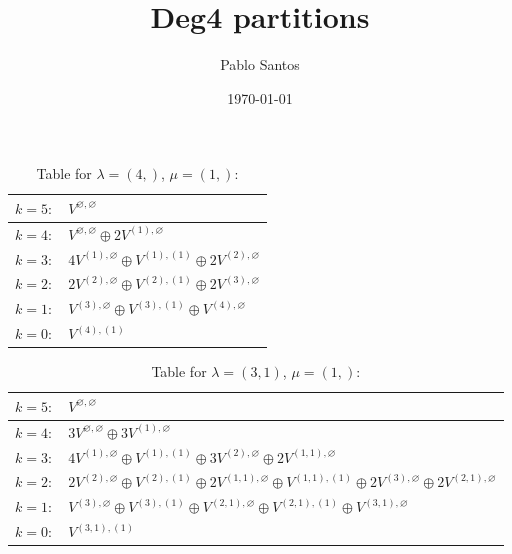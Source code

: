 \documentclass[a4paper,12pt]{article}
\title{Deg4 partitions}
\author{Pablo Santos}
\date{\today}
\begin{document}
\renewcommand{\arraystretch}{1.6} 
\begin{table}[H]
\centering
\caption{Table for $\lambda = (4,)$, $\mu = (1,)$:}
\begin{tabular}{|>{\centering\arraybackslash}p{15cm}|}
\hline
 $k = 5: \quad V^{\varnothing, \varnothing} $ \\ \hline
 $k = 4: \quad V^{\varnothing, \varnothing} \oplus 2 V^{(1), \varnothing} $ \\ \hline
 $k = 3: \quad 4 V^{(1), \varnothing} \oplus V^{(1), (1)} \oplus 2 V^{(2), \varnothing} $ \\ \hline
 $k = 2: \quad 2 V^{(2), \varnothing} \oplus V^{(2), (1)} \oplus 2 V^{(3), \varnothing} $ \\ \hline
 $k = 1: \quad V^{(3), \varnothing} \oplus V^{(3), (1)} \oplus V^{(4), \varnothing} $ \\ \hline
 $k = 0: \quad V^{(4), (1)} $ \\ \hline
\end{tabular}
\end{table}

\renewcommand{\arraystretch}{1.6} 
\begin{table}[H]
\centering
\caption{Table for $\lambda = (3, 1)$, $\mu = (1,)$:}
\begin{tabular}{|>{\centering\arraybackslash}p{15cm}|}
\hline
 $k = 5: \quad V^{\varnothing, \varnothing} $ \\ \hline
 $k = 4: \quad 3 V^{\varnothing, \varnothing} \oplus 3 V^{(1), \varnothing} $ \\ \hline
 $k = 3: \quad 4 V^{(1), \varnothing} \oplus V^{(1), (1)} \oplus 3 V^{(2), \varnothing} \oplus 2 V^{(1, 1), \varnothing} $ \\ \hline
 $k = 2: \quad 2 V^{(2), \varnothing} \oplus V^{(2), (1)} \oplus 2 V^{(1, 1), \varnothing} \oplus V^{(1, 1), (1)} \oplus 2 V^{(3), \varnothing} \oplus 2 V^{(2, 1), \varnothing} $ \\ \hline
 $k = 1: \quad V^{(3), \varnothing} \oplus V^{(3), (1)} \oplus V^{(2, 1), \varnothing} \oplus V^{(2, 1), (1)} \oplus V^{(3, 1), \varnothing} $ \\ \hline
 $k = 0: \quad V^{(3, 1), (1)} $ \\ \hline
\end{tabular}
\end{table}
\end{document}
